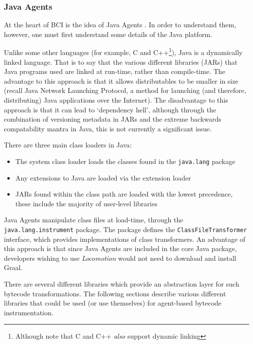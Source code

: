 		\subsubsection{Java Agents} \label{sec:instrumentation/bytecode-instr/agents}
		At the heart of BCI is the idea of Java Agents \citep{javaagents}. In order to understand them, however, one must first understand some details of the Java platform.
		
		Unlike some other languages (for example, C and C++\footnote{Although note that C and C++ \emph{also} support dynamic linking}), Java is a dynamically linked language. That is to say that the various different libraries (JARs) that Java programs used are linked at run-time, rather than compile-time. The advantage to this approach is that it allows distributables to be smaller in size (recall Java Network Launching Protocol, a method for launching (and therefore, distributing) Java applications over the Internet). The disadvantage to this approach is that it can lead to `dependency hell', although through the combination of versioning metadata in JARs and the extreme backwards compatability mantra in Java, this is not currently a significant issue.
		
		There are three main class loaders in Java:
		
		\begin{itemize}
			\item The system class loader loads the classes found in the \texttt{java.lang} package
			\item Any extensions to Java are loaded via the extension loader
			\item JARs found within the class path are loaded with the lowest precedence, these include the majority of user-level libraries
		\end{itemize}
		
		Java Agents manipulate class files at load-time, through the \texttt{java.lang.instrument} package. The package defines the \texttt{ClassFileTransformer} interface, which provides implementations of class transformers. An advantage of this approach is that since Java Agents are included in the core Java package, developers wishing to use \textit{Locomotion} would not need to download and install Graal.
		
		There are several different libraries which provide an abstraction layer for such bytecode transformations. The following sections describe various different libraries that could be used (or use themselves) for agent-based bytecode instrumentation.

